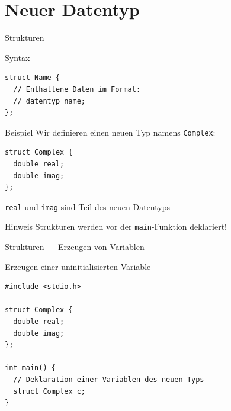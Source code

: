 \documentclass[presentation]{beamer}
\begin{document}
\section{Neuer Datentyp}
\label{sec:org780cbd2}
\begin{frame}[label={sec:org811b5e7},fragile]{Strukturen}
 \begin{block}{Syntax}
\begin{verbatim}
struct Name {
  // Enthaltene Daten im Format:
  // datentyp name;
};
\end{verbatim}
\end{block}
\begin{exampleblock}{Beispiel}
Wir definieren einen  neuen Typ namens {\color{solarizedYellow}\texttt{Complex}}:
\begin{verbatim}
struct Complex {
  double real;
  double imag;
};
\end{verbatim}
{\color{solarizedYellow}\texttt{real} }und {\color{solarizedYellow}\texttt{imag} }sind Teil des neuen Datentyps
\end{exampleblock}
\begin{alertblock}{Hinweis}
Strukturen werden vor der {\color{solarizedYellow}\texttt{main}}-Funktion deklariert!
\end{alertblock}
\end{frame}
\begin{frame}[label={sec:org2ff3c5e},fragile]{Strukturen --- Erzeugen von Variablen}
 \begin{exampleblock}{Erzeugen einer uninitialisierten Variable}
\begin{verbatim}
#include <stdio.h>

struct Complex {
  double real;
  double imag;
};

int main() {
  // Deklaration einer Variablen des neuen Typs
  struct Complex c;
}
\end{verbatim}
\end{exampleblock}
\end{frame}
\end{document}
